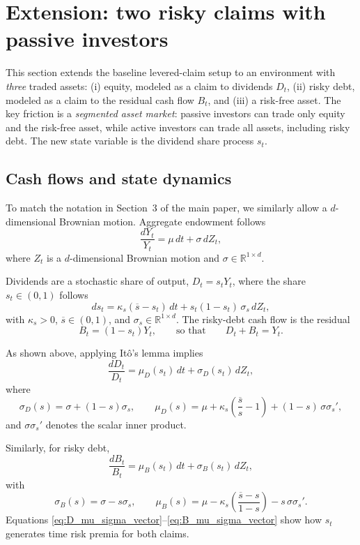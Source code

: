 \documentclass[11pt,english]{article}
\begin{document}
\section{Extension: two risky claims with passive investors}\label{sec:divclaim_passive_extension}

This section extends the baseline levered-claim setup to an environment with \emph{three} traded assets: (i) equity, modeled as a claim to dividends $D_t$, (ii) risky debt, modeled as a claim to the residual cash flow $B_t$, and (iii) a risk-free asset. The key friction is a \emph{segmented asset market}: passive investors can trade only equity and the risk-free asset, while active investors can trade all assets, including risky debt. The new state variable is the dividend share process $s_t$.

\subsection{Cash flows and state dynamics}

To match the notation in Section~3 of the main paper, we similarly allow a $d$-dimensional Brownian motion. Aggregate endowment follows
\[
    \frac{dY_t}{Y_t}=\mu\,dt+\sigma\,dZ_t,
\]
where $Z_t$ is a $d$-dimensional Brownian motion and $\sigma\in\mathbb{R}^{1\times d}$.

Dividends are a stochastic share of output, $D_t=s_tY_t$, where the share $s_t\in(0,1)$ follows
\begin{equation}\label{eq:s_process}
    ds_t=\kappa_s(\overline{s}-s_t)\,dt + s_t(1-s_t)\,\sigma_s\,dZ_t,
\end{equation}
with $\kappa_s>0$, $\overline{s}\in(0,1)$, and $\sigma_s\in\mathbb{R}^{1\times d}$. The risky-debt cash flow is the residual
\[
    B_t=(1-s_t)Y_t,
    \qquad\text{so that}\qquad
    D_t+B_t=Y_t.
\]

As shown above, applying It\^{o}'s lemma implies
\begin{equation}\label{eq:D_dynamics_vector}
    \frac{dD_t}{D_t}=\mu_D(s_t)\,dt+\sigma_D(s_t)\,dZ_t,
\end{equation}
where
\begin{equation}\label{eq:D_mu_sigma_vector}
    \sigma_D(s)=\sigma + (1-s)\sigma_s,
    \qquad
    \mu_D(s)=\mu + \kappa_s\!\left(\frac{\overline{s}}{s}-1\right) + (1-s)\,\sigma\sigma_s',
\end{equation}
and $\sigma\sigma_s'$ denotes the scalar inner product.

Similarly, for risky debt,
\begin{equation}\label{eq:B_dynamics_vector}
    \frac{dB_t}{B_t}=\mu_B(s_t)\,dt+\sigma_B(s_t)\,dZ_t,
\end{equation}
with
\begin{equation}\label{eq:B_mu_sigma_vector}
    \sigma_B(s)=\sigma - s\sigma_s,
    \qquad
    \mu_B(s)=\mu - \kappa_s\!\left(\frac{\overline{s}-s}{1-s}\right) - s\,\sigma\sigma_s'.
\end{equation}
Equations \eqref{eq:D_mu_sigma_vector}--\eqref{eq:B_mu_sigma_vector} show how $s_t$ generates time risk premia for both claims.
\end{document}
